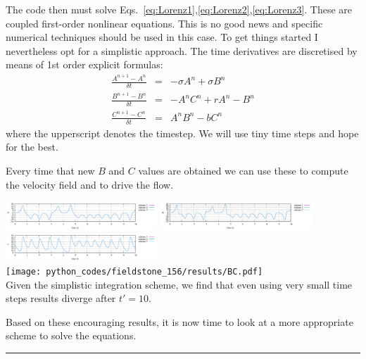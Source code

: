 The code then must solve Eqs.~\eqref{eq:Lorenz1},\eqref{eq:Lorenz2},\eqref{eq:Lorenz3}.
These are coupled first-order nonlinear equations. This is no good news and 
specific numerical techniques should be used in this case. 
To get things started I nevertheless opt for a simplistic approach. 
The time derivatives are discretised by means of 1st order explicit formulas:
\begin{eqnarray}
\frac{A^{n+1}-A^n}{\delta t} &=& -\sigma A^n + \sigma B^n \\
\frac{B^{n+1}-B^n}{\delta t} &=& -A^n C^n + rA^n -B^n  \\
\frac{C^{n+1}-C^n}{\delta t} &=& A^n B^n - bC^n \label{eq:Lorenz3}
\end{eqnarray}
where the upperscript denotes the timestep. We will use tiny time steps and hope for the best.

Every time that new $B$ and $C$ values are obtained we can use these to compute the 
velocity field and to drive the flow.


\begin{center}
\includegraphics[width=5.7cm]{python_codes/fieldstone_156/results/A.pdf}
\includegraphics[width=5.7cm]{python_codes/fieldstone_156/results/B.pdf}
\includegraphics[width=5.7cm]{python_codes/fieldstone_156/results/C.pdf}\\
\texttt{[image: python\_codes/fieldstone\_156/results/BC.pdf]}\\
{\captionfont Given the simplistic integration scheme, we find that 
even using very small time steps results diverge after $t'=10$.}
\end{center}

Based on these encouraging results, it is now time to look at a more appropriate
scheme to solve the equations.


\par\noindent\rule{\textwidth}{0.4pt}

\vspace{.5cm}


